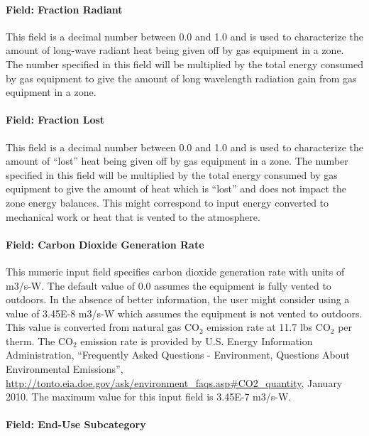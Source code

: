 \paragraph{Field: Fraction Radiant}\label{field-fraction-radiant-3}

This field is a decimal number between 0.0 and 1.0 and is used to characterize the amount of long-wave radiant heat being given off by gas equipment in a zone. The number specified in this field will be multiplied by the total energy consumed by gas equipment to give the amount of long wavelength radiation gain from gas equipment in a zone.

\paragraph{Field: Fraction Lost}\label{field-fraction-lost-1}

This field is a decimal number between 0.0 and 1.0 and is used to characterize the amount of ``lost'' heat being given off by gas equipment in a zone. The number specified in this field will be multiplied by the total energy consumed by gas equipment to give the amount of heat which is ``lost'' and does not impact the zone energy balances. This might correspond to input energy converted to mechanical work or heat that is vented to the atmosphere.

\paragraph{Field: Carbon Dioxide Generation Rate}\label{field-carbon-dioxide-generation-rate-1}

This numeric input field specifies carbon dioxide generation rate with units of m3/s-W. The default value of 0.0 assumes the equipment is fully vented to outdoors. In the absence of better information, the user might consider using a value of 3.45E-8 m3/s-W which assumes the equipment is not vented to outdoors. This value is converted from natural gas CO\(_{2}\) emission rate at 11.7 lbs CO\(_{2}\) per therm. The CO\(_{2}\) emission rate is provided by U.S. Energy Information Administration, ``Frequently Asked Questions - Environment, Questions About Environmental Emissions'', \url{http://tonto.eia.doe.gov/ask/environment_faqs.asp#CO2_quantity}, January 2010. The maximum value for this input field is 3.45E-7 m3/s-W.

\paragraph{Field: End-Use Subcategory}\label{field-end-use-subcategory-2-001}

